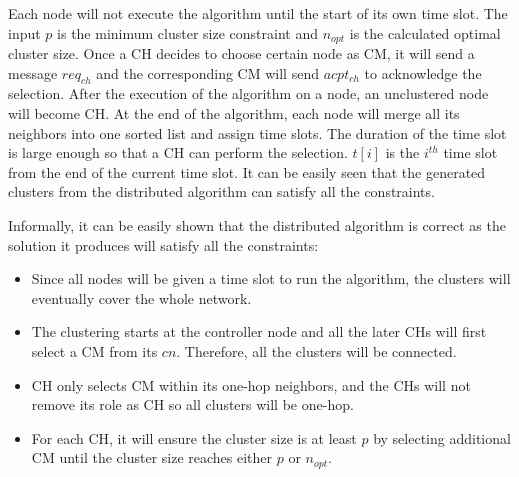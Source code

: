 Each node will not execute the algorithm until the start of its own time slot. The input \(p\) is the minimum cluster size constraint and \(n_{opt}\) is the calculated optimal cluster size. Once a CH decides to choose certain node as CM, it will send a message \(req_{ch}\) and the corresponding CM will send \(acpt_{ch}\) to acknowledge the selection. After the execution of the algorithm on a node, an unclustered node will become CH. At the end of the algorithm, each node will merge all its neighbors into one sorted list and assign time slots. The duration of the time slot is large enough so that a CH can perform the selection. \(t[i]\) is the \(i^{th}\) time slot from the end of the current time slot. It can be easily seen that the generated clusters from the distributed algorithm can satisfy all the constraints.

Informally, it can be easily shown that the distributed algorithm is correct as the solution it produces will satisfy all the constraints:
\begin{itemize}
\item Since all nodes will be given a time slot to run the algorithm, the clusters will eventually cover the whole network.
\item The clustering starts at the controller node and all the later CHs will first select a CM from its \(cn\). Therefore, all the clusters will be connected.
\item CH only selects CM within its one-hop neighbors, and the CHs will not remove its role as CH so all clusters will be one-hop.
\item For each CH, it will ensure the cluster size is at least \(p\) by selecting additional CM until the cluster size reaches either \(p\) or \(n_{opt}\).
\end{itemize}
